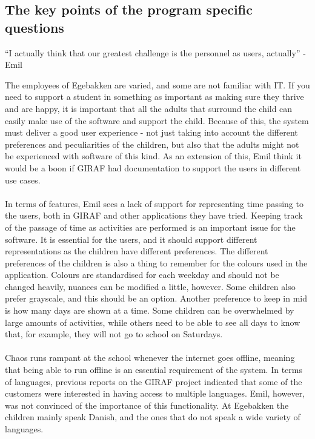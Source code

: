 \subsection{The key points of the program specific questions}
\begin{displayquote}
    ``I actually think that our greatest challenge is the personnel as users, actually''  - Emil
\end{displayquote}
The employees of Egebakken are varied, and some are not familiar with IT.
If you need to support a student in something as important as making sure they thrive and are happy, it is important that all the adults that surround the child can easily make use of the software and support the child.
Because of this, the system must deliver a good user experience - not just taking into account the different preferences and peculiarities of the children, but also that the adults might not be experienced with software of this kind.
As an extension of this, Emil think it would be a boon if GIRAF had documentation to support the users in different use cases.
\\\\
In terms of features, Emil sees a lack of support for representing time passing to the users, both in GIRAF and other applications they have tried.
Keeping track of the passage of time as activities are performed is an important issue for the software.
It is essential for the users, and it should support different representations as the children have different preferences.
The different preferences of the children is also a thing to remember for the colours used in the application.
Colours are standardised for each weekday and should not be changed heavily, nuances can be modified a little, however.
Some children also prefer grayscale, and this should be an option.
Another preference to keep in mid is how many days are shown at a time.
Some children can be overwhelmed by large amounts of activities, while others need to be able to see all days to know that, for example, they will not go to school on Saturdays.
\\\\
Chaos runs rampant at the school whenever the internet goes offline, meaning that being able to run offline is an essential requirement of the system. 
In terms of languages, previous reports on the GIRAF project indicated that some of the customers were interested in having access to multiple languages.
Emil, however, was not convinced of the importance of this functionality.
At Egebakken the children mainly speak Danish, and the ones that do not speak a wide variety of languages. 
